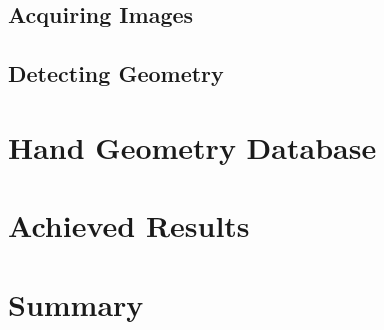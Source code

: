 \documentclass[11pt,a4paper]{article}
\begin{document}
\subsection{Acquiring Images}
\subsection{Detecting Geometry}

\section{Hand Geometry Database}
\label{sec:db}

\section{Achieved Results}
\label{sec:res}

\section{Summary}
\label{sec:sum}
\end{document}
